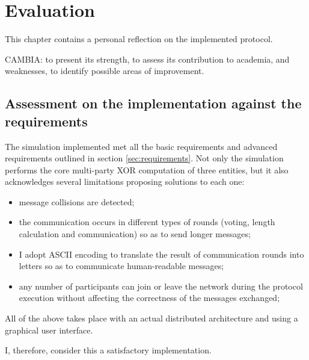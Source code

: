 \chapter{Evaluation}
This chapter contains a personal reflection on the implemented protocol. 

CAMBIA: to present its strength, to assess its contribution to academia,  and weaknesses, to identify possible areas of improvement. 

\section{Assessment on the implementation against the requirements}
The simulation implemented met all the basic requirements and advanced requirements outlined in section \ref{sec:requirements}. Not only the simulation performs the core multi-party XOR computation of three entities, but it also acknowledges several limitations proposing solutions to each one:
\begin{itemize}
    \item message collisions are detected;
    \item the communication occurs in different types of rounds (voting, length calculation and communication) so as to send longer messages;
    \item I adopt ASCII encoding to translate the result of communication rounds into letters so as to communicate human-readable messages;
    \item any number of participants can join or leave the network during the protocol execution without affecting the correctness of the messages exchanged;
\end{itemize}
All of the above takes place with an actual distributed architecture and using a graphical user interface.

I, therefore, consider this a satisfactory implementation.


